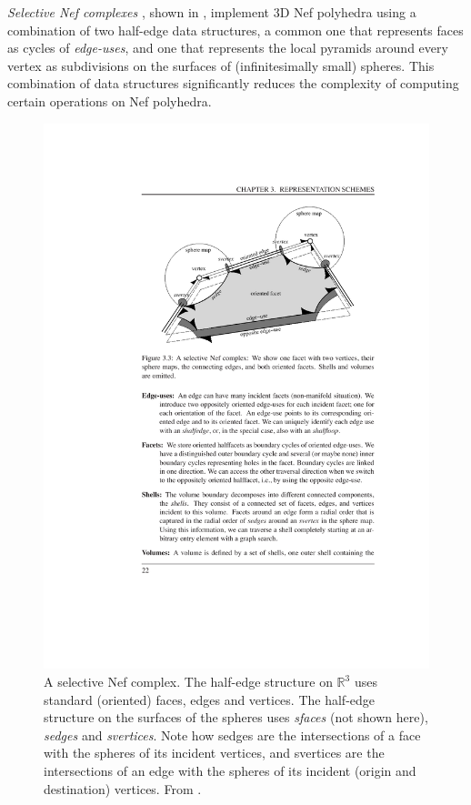 \emph{Selective Nef complexes} \citep{Hachenberger06}, shown in , implement 3D Nef polyhedra using a combination of two half-edge data structures, a common one that represents faces as cycles of \emph{edge-uses}, and one that represents the local pyramids around every vertex as subdivisions on the surfaces of (infinitesimally small) spheres.
This combination of data structures significantly reduces the complexity of computing certain operations on Nef polyhedra.
\begin{figure}[tbp]
\includegraphics[width=\linewidth]{figs/snc}
\caption[A selective Nef complex]{A selective Nef complex. The half-edge structure on $\mathbb{R}^3$ uses standard (oriented) faces, edges and vertices. The half-edge structure on the surfaces of the spheres uses \emph{sfaces} (not shown here), \emph{sedges} and \emph{svertices}. Note how sedges are the intersections of a face with the spheres of its incident vertices, and svertices are the intersections of an edge with the spheres of its incident (origin and destination) vertices. From \citet{Hachenberger06}.}
\label{fig:snc}
\end{figure}

